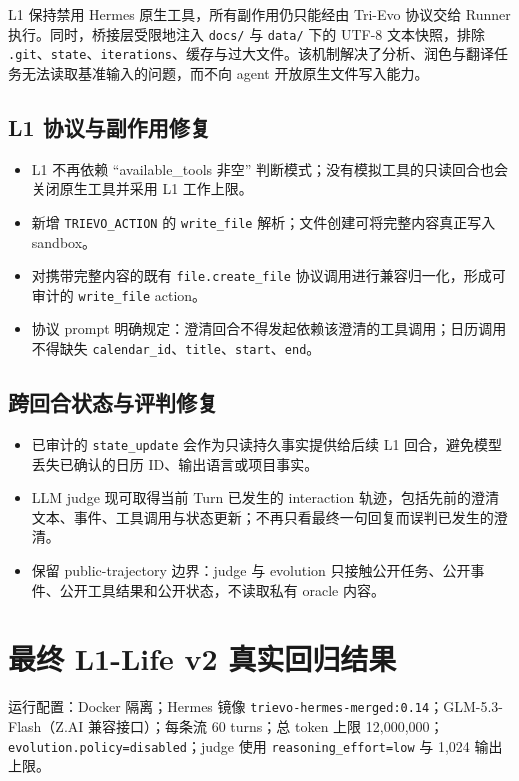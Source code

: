\documentclass[11pt,a4paper]{ctexart}
\begin{document}
L1 保持禁用 Hermes 原生工具，所有副作用仍只能经由 Tri-Evo 协议交给 Runner 执行。同时，桥接层受限地注入 \texttt{docs/} 与 \texttt{data/} 下的 UTF-8 文本快照，排除 \texttt{.git}、\texttt{state}、\texttt{iterations}、缓存与过大文件。该机制解决了分析、润色与翻译任务无法读取基准输入的问题，而不向 agent 开放原生文件写入能力。

\subsection{L1 协议与副作用修复}

\begin{itemize}
  \item L1 不再依赖 ``available\_tools 非空'' 判断模式；没有模拟工具的只读回合也会关闭原生工具并采用 L1 工作上限。
  \item 新增 \texttt{TRIEVO\_ACTION} 的 \texttt{write\_file} 解析；文件创建可将完整内容真正写入 sandbox。
  \item 对携带完整内容的既有 \texttt{file.create\_file} 协议调用进行兼容归一化，形成可审计的 \texttt{write\_file} action。
  \item 协议 prompt 明确规定：澄清回合不得发起依赖该澄清的工具调用；日历调用不得缺失 \texttt{calendar\_id}、\texttt{title}、\texttt{start}、\texttt{end}。
\end{itemize}

\subsection{跨回合状态与评判修复}

\begin{itemize}
  \item 已审计的 \texttt{state\_update} 会作为只读持久事实提供给后续 L1 回合，避免模型丢失已确认的日历 ID、输出语言或项目事实。
  \item LLM judge 现可取得当前 Turn 已发生的 interaction 轨迹，包括先前的澄清文本、事件、工具调用与状态更新；不再只看最终一句回复而误判已发生的澄清。
  \item 保留 public-trajectory 边界：judge 与 evolution 只接触公开任务、公开事件、公开工具结果和公开状态，不读取私有 oracle 内容。
\end{itemize}

\section{最终 L1-Life v2 真实回归结果}

运行配置：Docker 隔离；Hermes 镜像 \texttt{trievo-hermes-merged:0.14}；GLM-5.3-Flash（Z.AI 兼容接口）；每条流 60 turns；总 token 上限 12,000,000；\texttt{evolution.policy=disabled}；judge 使用 \texttt{reasoning\_effort=low} 与 1,024 输出上限。
\end{document}
